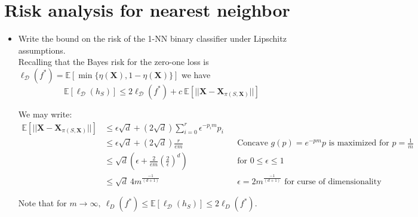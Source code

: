 \newpage
\section{Risk analysis for nearest neighbor}

\begin{itemize}

    \item Write the bound on the risk of the 1-NN binary classifier under Lipschitz assumptions.\\

        Recalling that the Bayes risk for the zero-one loss is $\ell_{\mathcal{D}}(f^*) = \mathbb{E}[\min{\{\eta(\boldsymbol{X}), 1 - \eta(\boldsymbol{X})\}}]$ we have
        $$
        \mathbb{E}[\ell_{\mathcal{D}}(h_{S})] \leq 2\ell_{\mathcal{D}}(f^*) + c\ \mathbb{E}\left[|| \boldsymbol{X} - \boldsymbol{X}_{\pi(S, \boldsymbol{X})} ||\right]
        $$
        
        We may write:
        \begin{equation}
            \begin{aligned}
                \mathbb{E}\left[|| \boldsymbol{X} - \boldsymbol{X}_{\pi(S, \boldsymbol{X})} ||\right] & \leq \epsilon \sqrt{d} + (2 \sqrt{d}) \sum_{i=0}^{r} \epsilon^{-p_{i}m}p_{i}\\
                                                                                                      & \leq \epsilon \sqrt{d} + (2 \sqrt{d}) \frac{r}{em} && \text{Concave $g(p) = e^{-pm}p$ is maximized for $p = \frac{1}{m}$}\\ 
                                                                                                      & \leq \sqrt{d} \left(\epsilon + \frac{2}{em} \left(\frac{2}{\epsilon}\right)^{d} \right) && \text{for $0 \leq \epsilon \leq 1$}\\
                                                                                                      & \leq \sqrt{d} \ 4m^{\frac{-1}{(d+1)}} && \text{$\epsilon = 2 m^{\frac{-1}{(d+1)}}$ for curse of dimensionality}
            \end{aligned}
        \end{equation}

        Note that for $m \rightarrow \infty, \ \ell_{D}(f^*) \leq \mathbb{E}[\ell_{\mathcal{D}}(h_{S})] \leq 2\ell_{D}(f^*)$. 
\end{itemize}
